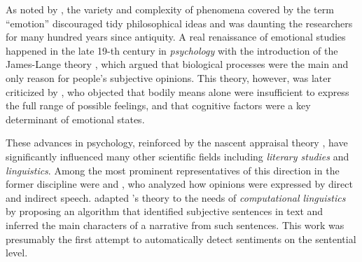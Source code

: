 As noted by \citet{Sousa:14}, the variety and complexity of phenomena
covered by the term ``emotion'' discouraged tidy philosophical ideas
and was daunting the researchers for many hundred years since
antiquity.  A real renaissance of emotional studies happened in the
late 19-th century in \emph{psychology} with the introduction of the
James-Lange theory \cite{James:1884,Lange:1885}, which argued that
biological processes were the main and only reason for people's
subjective opinions.  This theory, however, was later criticized by
\citet{Schachter:62}, who objected that bodily means alone were
insufficient to express the full range of possible feelings, and that
cognitive factors were a key determinant of emotional states.


These advances in psychology, reinforced by the nascent appraisal
theory \citep{Arnold:60}, have significantly influenced many other
scientific fields including \emph{literary studies} and
\emph{linguistics}.  Among the most prominent representatives of this
direction in the former discipline were \citet{Rorty:80} and
\citet{Banfield:82}, who analyzed how opinions were expressed by
direct and indirect speech.  \citet{Wiebe:90a,Wiebe:94} adapted
\citeauthor{Banfield:82}'s theory to the needs of \emph{computational
  linguistics} by proposing an algorithm that identified subjective
sentences in text and inferred the main characters of a narrative from
such sentences.  This work was presumably the first attempt to
automatically detect sentiments on the sentential level.

